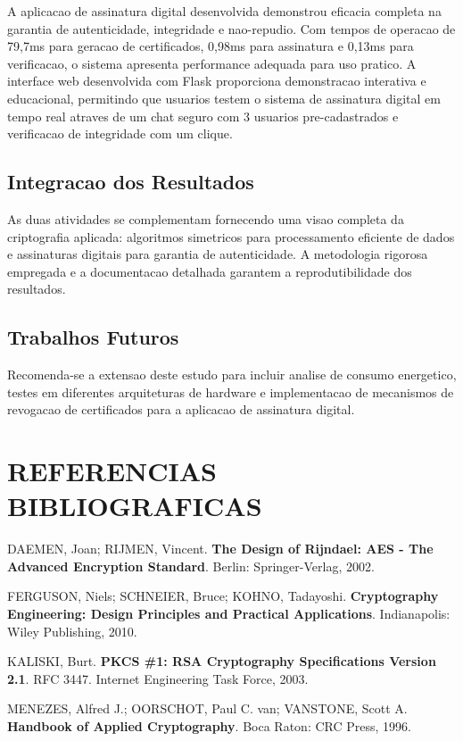 \documentclass[12pt,a4paper,oneside]{article}
\begin{document}
A aplicacao de assinatura digital desenvolvida demonstrou eficacia completa na garantia de autenticidade, integridade e nao-repudio. Com tempos de operacao de 79,7ms para geracao de certificados, 0,98ms para assinatura e 0,13ms para verificacao, o sistema apresenta performance adequada para uso pratico. A interface web desenvolvida com Flask proporciona demonstracao interativa e educacional, permitindo que usuarios testem o sistema de assinatura digital em tempo real atraves de um chat seguro com 3 usuarios pre-cadastrados e verificacao de integridade com um clique.

\subsection{Integracao dos Resultados}

As duas atividades se complementam fornecendo uma visao completa da criptografia aplicada: algoritmos simetricos para processamento eficiente de dados e assinaturas digitais para garantia de autenticidade. A metodologia rigorosa empregada e a documentacao detalhada garantem a reprodutibilidade dos resultados.

\subsection{Trabalhos Futuros}

Recomenda-se a extensao deste estudo para incluir analise de consumo energetico, testes em diferentes arquiteturas de hardware e implementacao de mecanismos de revogacao de certificados para a aplicacao de assinatura digital.

\section{REFERENCIAS BIBLIOGRAFICAS}

DAEMEN, Joan; RIJMEN, Vincent. \textbf{The Design of Rijndael: AES - The Advanced Encryption Standard}. Berlin: Springer-Verlag, 2002.

FERGUSON, Niels; SCHNEIER, Bruce; KOHNO, Tadayoshi. \textbf{Cryptography Engineering: Design Principles and Practical Applications}. Indianapolis: Wiley Publishing, 2010.

KALISKI, Burt. \textbf{PKCS \#1: RSA Cryptography Specifications Version 2.1}. RFC 3447. Internet Engineering Task Force, 2003.

MENEZES, Alfred J.; OORSCHOT, Paul C. van; VANSTONE, Scott A. \textbf{Handbook of Applied Cryptography}. Boca Raton: CRC Press, 1996.
\end{document}
